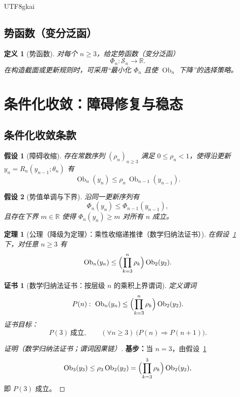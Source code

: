 \documentclass[12pt]{article}
\newtheorem{definition}{定义}[section]
\newtheorem{assumption}{假设}[section]
\newtheorem{theorem}{定理}[section]
\newtheorem{Certificate}{证书}[section]
\newcommand{\Ob}{\operatorname{Ob}}
\begin{document}
\begin{CJK*}{UTF8}{gkai}
\subsection{势函数（变分泛函）}

\begin{definition}[势函数]\label{def:potential}
对每个 $n\ge3$，给定势函数（变分泛函）
\[
\Phi_n:\mathcal S_n\to\mathbb R.
\]
在构造截面或更新规则时，可采用“最小化 $\Phi_n$ 且使 $\Ob_n$ 下降”的选择策略。
\end{definition}

\section{条件化收敛：障碍修复与稳态}

\subsection{条件化收敛条款}

\begin{assumption}[障碍收缩]\label{ass:ob-contract}
存在常数序列 $(\rho_n)_{n\ge3}$ 满足 $0\le\rho_n<1$，使得沿更新 $y_n=R_n(y_{n-1};\theta_n)$ 有
\[
\Ob_n(y_n)\le \rho_n\,\Ob_{n-1}(y_{n-1}).
\]
\end{assumption}

\begin{assumption}[势值单调与下界]\label{ass:phi-monotone}
沿同一更新序列有
\[
\Phi_n(y_n)\le \Phi_{n-1}(y_{n-1}),
\]
且存在下界 $m\in\mathbb R$ 使得 $\Phi_n(y_n)\ge m$ 对所有 $n$ 成立。
\end{assumption}

\begin{theorem}[公理（降级为定理）：乘性收缩递推律（数学归纳法证书）]
\label{thm:axiom-downgrade-induction}
在假设~\ref{ass:ob-contract} 下，对任意 $n\ge3$ 有
\[
\Ob_n(y_n)
\le
\Bigl(\prod_{k=3}^{n}\rho_k\Bigr)\Ob_2(y_2).
\]
\end{theorem}

\begin{Certificate}[数学归纳法证书：按层级 $n$ 的乘积上界谓词]\label{cert:axiom-downgrade-induction}
定义谓词
\[
P(n):\ \Ob_n(y_n)\le \Bigl(\prod_{k=3}^{n}\rho_k\Bigr)\Ob_2(y_2).
\]
证书目标：
\[
P(3)\ \text{成立},\qquad
(\forall n\ge3)\ \bigl(P(n)\Rightarrow P(n+1)\bigr).
\]
\end{Certificate}

\begin{proof}[证明（数学归纳法证书；谓词因果链）]
\textbf{基步：}当 $n=3$，由假设~\ref{ass:ob-contract}
\[
\Ob_3(y_3)\le\rho_3\Ob_2(y_2)=\Bigl(\prod_{k=3}^{3}\rho_k\Bigr)\Ob_2(y_2),
\]
即 $P(3)$ 成立。


\end{proof}
\end{CJK*}
\end{document}
